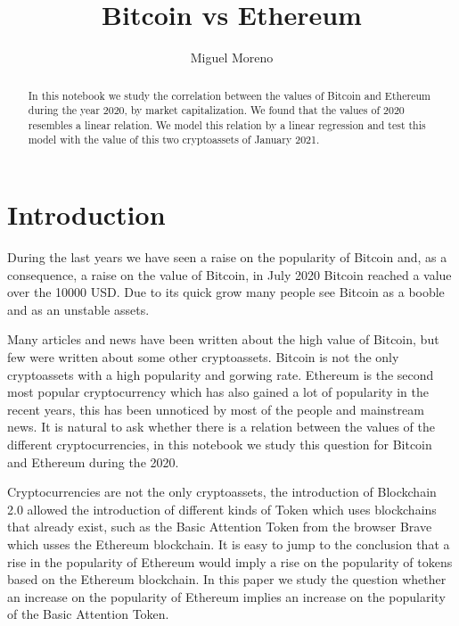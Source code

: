 \documentclass[11pt]{article}
\title{Bitcoin vs Ethereum}
\author{Miguel Moreno}
\begin{document}
    
    
    \maketitle
    
    

   \begin{abstract}
   In this notebook we study the correlation between the values
of Bitcoin and Ethereum during the year 2020, by market capitalization.
We found that the values of 2020 resembles a linear relation. We model
this relation by a linear regression and test this model with the value
of this two cryptoassets of January 2021.
   \end{abstract}


    \section{Introduction}\label{introduction}

During the last years we have seen a raise on the popularity of Bitcoin
and, as a consequence, a raise on the value of Bitcoin, in July 2020
Bitcoin reached a value over the 10000 USD. Due to its quick grow many
people see Bitcoin as a booble and as an unstable assets.

Many articles and news have been written about the high value of
Bitcoin, but few were written about some other cryptoassets. Bitcoin is
not the only cryptoassets with a high popularity and gorwing rate.
Ethereum is the second most popular cryptocurrency which has also gained
a lot of popularity in the recent years, this has been unnoticed by most
of the people and mainstream news. It is natural to ask whether there is
a relation between the values of the different cryptocurrencies, in this
notebook we study this question for Bitcoin and Ethereum during the
2020.

Cryptocurrencies are not the only cryptoassets, the introduction of
Blockchain 2.0 allowed the introduction of different kinds of Token
which uses blockchains that already exist, such as the Basic Attention
Token from the browser Brave which usses the Ethereum blockchain. It is
easy to jump to the conclusion that a rise in the popularity of Ethereum
would imply a rise on the popularity of tokens based on the Ethereum
blockchain. In this paper we study the question whether an increase on
the popularity of Ethereum implies an increase on the popularity of the
Basic Attention Token.
\end{document}

